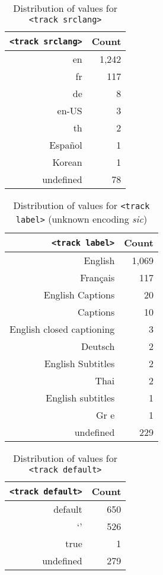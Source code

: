 \documentclass{sig-alternate}
\makeatletter
\newcommand\unknown{%
  \sbox\Diam@nd{\raisebox{-1ex}{\scalebox{1}[1.2]{\rotatebox{45}{\rule{0.8em}{0.8em}}}}}%
  \makebox[\wd\Diam@nd]{\makebox[0pt]{\usebox\Diam@nd}\makebox[0pt]{\textcolor{white}{?}}}}
\makeatother
\begin{document}
\begin{table}[p]
  \centering
  \begin{tabular}{ r | r }                       
    \texttt{<track srclang>} & Count \\
    \hline  
    en & 1,242\\
    fr & 117\\
    de & 8\\    
    en-US & 3\\
    th & 2\\
    Español & 1\\
    Korean & 1\\
    undefined & 78\\    
  \end{tabular}
  \caption{Distribution of values for
    \texttt{<track srclang>}}
  \label{table:srclang}    
\end{table}

\begin{table}[p]
  \centering
  \begin{tabular}{ r | r }                       
    \texttt{<track label>} & Count \\
    \hline  
    English & 1,069\\
    Français & 117\\    
    English Captions & 20\\    
    Captions & 10\\
    English closed captioning & 3\\    
    Deutsch & 2\\    
    English Subtitles & 2\\
    Thai & 2\\    
    English subtitles & 1\\
    Gr\unknown\unknown e & 1\\
    undefined & 229\\
  \end{tabular}
  \caption{Distribution of values for
    \texttt{<track label>} \tiny (unknown encoding \emph{sic})}
  \label{table:label}    
\end{table}
  
\begin{table}[p]
  \centering
  \begin{tabular}{ r | r }                       
    \texttt{<track default>} & Count \\
    \hline
    default & 650\\
    `' & 526\\
    true & 1\\
    undefined & 279
  \end{tabular}
  \caption{Distribution of values for
    \texttt{<track default>}}
  \label{table:default}    
\end{table}
\end{document}

